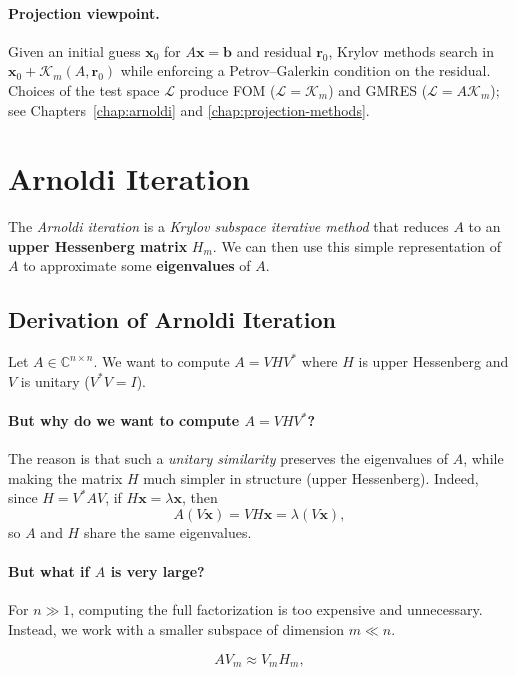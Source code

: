 \paragraph{Projection viewpoint.} Given an initial guess $\mathbf{x}_0$ for $A\mathbf{x}=\mathbf{b}$ and residual $\mathbf{r}_0$, Krylov methods search in $\mathbf{x}_0+\mathcal{K}_m(A,\mathbf{r}_0)$ while enforcing a Petrov--Galerkin condition on the residual. Choices of the test space $\mathcal{L}$ produce FOM ($\mathcal{L}=\mathcal{K}_m$) and GMRES ($\mathcal{L}=A\mathcal{K}_m$); see Chapters~\ref{chap:arnoldi} and \ref{chap:projection-methods}.

\section{Arnoldi Iteration}
\label{sec:arnoldi-iteration}
The \emph{Arnoldi iteration} is a \emph{Krylov subspace iterative method} that reduces $A$ to an \textbf{upper Hessenberg matrix} $H_m$.
We can then use this simple representation of $A$ to approximate some \textbf{eigenvalues} of $A$.

\subsection{Derivation of Arnoldi Iteration}
Let $A \in \mathbb{C}^{n \times n}$.
We want to compute $A = V H V^\ast$ where $H$ is upper Hessenberg and $V$ is unitary ($V^\ast V = I$).

\paragraph{But why do we want to compute $A = V H V^\ast$?}
The reason is that such a \emph{unitary similarity} preserves the eigenvalues of $A$, while making the matrix $H$ much simpler in structure (upper Hessenberg).
Indeed, since $H = V^\ast A V$, if $H\mathbf{x} = \lambda \mathbf{x}$, then
\[
  A(V\mathbf{x}) = V H \mathbf{x} = \lambda (V\mathbf{x}),
\]
so $A$ and $H$ share the same eigenvalues.

\paragraph{But what if $A$ is very large?}
For $n \gg 1$, computing the full factorization is too expensive and unnecessary.
Instead, we work with a smaller subspace of dimension $m \ll n$.

\[
  A V_m \approx V_m H_m,
\]

